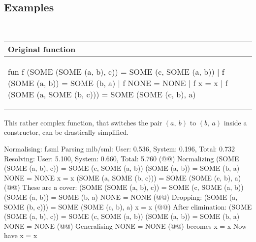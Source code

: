 \subsection{Examples}
\label{sec:eval-normalform-examples}


\begin{example}\
  \label{ex:eval-normal-example-f}\\
  
  \begin{center}
    \begin{tabular}{|l|}
      \hline
      \textbf{Original function}
      \\\hline
      \begin{sml}
fun f (SOME (SOME (a, b), c)) = SOME (c, SOME (a, b))
  | f (SOME (a, b)) = SOME (b, a)
  | f NONE = NONE
  | f x = x
  | f (SOME (a, SOME (b, c))) = SOME (SOME (c, b), a)        
      \end{sml}
      \\\hline
    \end{tabular}
  \end{center}
  
  This rather complex function, that switches the pair $(a,\ b)$ to $(b,\ a)$ inside a
  \ttt{SOME} constructor, can be drastically simplified.
  
  \begin{narrow}{-3em}{0em}
    \setlength{\linewidth}{1.2\linewidth}
    \footnotesize
    
    \begin{multicols}{2}           
      \begin{sml}
Normalising: f.sml
Parsing mlb/sml: 
  User: 0.536, System: 0.196, Total: 0.732
Resolving: 
  User: 5.100, System: 0.660, Total: 5.760
(@@)
Normalizing
  (SOME (SOME (a, b), c)) = SOME (c, SOME (a, b))
  (SOME (a, b)) = SOME (b, a)
  NONE = NONE
  x = x
  (SOME (a, SOME (b, c))) = SOME (SOME (c, b), a)
(@@)
These are a cover:
  (SOME (SOME (a, b), c)) = SOME (c, SOME (a, b))
  (SOME (a, b)) = SOME (b, a)
  NONE = NONE
(@@)
Dropping:
  (SOME (a, SOME (b, c))) = SOME (SOME (c, b), a)
  x = x
(@@)
After elimination:
  (SOME (SOME (a, b), c)) = SOME (c, SOME (a, b))
  (SOME (a, b)) = SOME (b, a)
  NONE = NONE
(@@)
Generalising
  NONE = NONE
(@@)
becomes
  x = x
Now have
  x = x


\end{sml}
\end{multicols}
\end{narrow}
\end{example}
